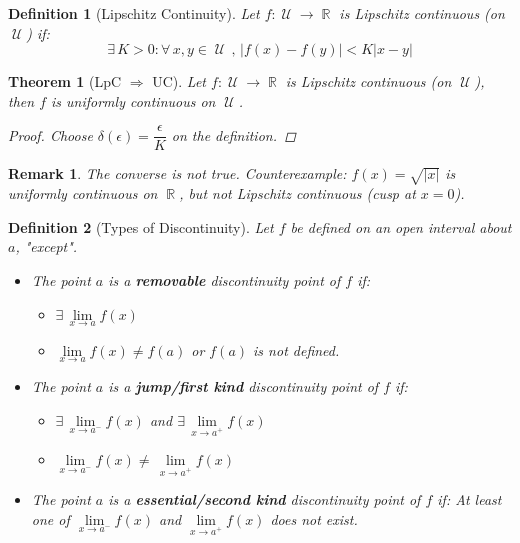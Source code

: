 \documentclass[12pt]{article}
\let\RA\Rightarrow
\newcommand{\Forall}[1]{\forall\,{#1}\,,\,}
\newcommand{\Exist}[1]{\exists\,{#1}:}
\DeclareMathOperator{\R}{\mathbb{R}}
\DeclareMathOperator{\U}{\mathcal{U}}
\newtheorem{theorem}{Theorem}[subsection]
\newtheorem{definition}{Definition}[subsection]
\newtheorem{remark}{Remark}[subsection]
\begin{document}
\begin{definition}[Lipschitz Continuity]
  Let $f:\U\to\R$ is Lipschitz continuous (on $\U$) if:
  $$\Exist{K>0}\Forall{x,y\in\U} |f(x)-f(y)|<K|x-y|$$
\end{definition}

\begin{theorem}[LpC $\RA$ UC]
  Let $f:\U\to\R$ is Lipschitz continuous (on $\U$), then $f$ is uniformly continuous on $\U$.
  \begin{proof}
    Choose $\delta(\epsilon)=\dfrac{\epsilon}{K}$ on the definition.
  \end{proof}
\end{theorem}

\begin{remark}
  The converse is not true. Counterexample: $f(x)=\sqrt{|x|}$ is uniformly continuous on $\R$, but not Lipschitz continuous (cusp at $x=0$).
\end{remark}

\begin{definition}[Types of Discontinuity]Let $f$ be defined on an open interval about $a$, "except".
  \begin{itemize}
    \item[] The point $a$ is a \textbf{removable} discontinuity point of $f$ if:\begin{itemize}
      \item[(a)] $\exists\,\lim\limits_{x\to a} f(x)$
      \item[(b)] $\lim\limits_{x\to a} f(x)\neq f(a)$ or $f(a)$ is not defined.
    \end{itemize}
    \item[] The point $a$ is a \textbf{jump/first kind} discontinuity point of $f$ if:\begin{itemize}
      \item[(a)] $\exists\,\lim\limits_{x\to a^{-}} f(x)$ and $\exists\,\lim\limits_{x\to a^{+}} f(x)$
      \item[(b)]  $\lim\limits_{x\to a^{-}} f(x) \neq\,\lim\limits_{x\to a^{+}} f(x)$
    \end{itemize}
    \item[] The point $a$ is a \textbf{essential/second kind} discontinuity point of $f$ if: At least one of $\lim\limits_{x\to a^{-}} f(x)$ and $\lim\limits_{x\to a^{+}} f(x)$ does not exist.
  \end{itemize}
\end{definition}

\pagebreak
\end{document}
